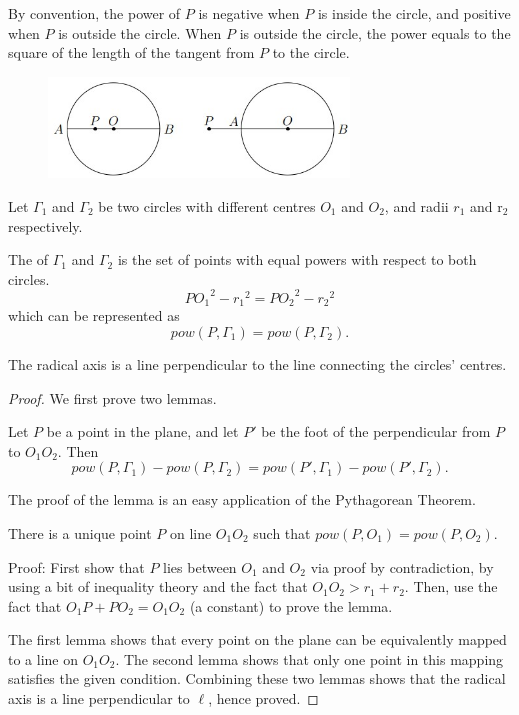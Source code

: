By convention, the power of $P$ is negative when $P$ is inside the circle, and positive when $P$
is outside the circle. When $P$ is outside the circle, the power equals to the square of the length
of the tangent from $P$ to the circle.

\begin{figure}[H]
    \centering
    \includegraphics[width=8cm]{images/Power_of_a_point3.jpg}
\end{figure}

Let $\Gamma_1$ and $\Gamma_2$ be two circles with different centres $O_1$ and $O_2$, and radii $r_1$ and r$_2$ respectively.

\begin{definition}
The  of $\Gamma_1$ and $\Gamma_2$ is the set of points with equal powers with respect to both circles.
\[ {PO_1}^2-{r_1}^2 = {PO_2}^2-{r_2}^2 \]
which can be represented as 
\[ pow(P, \Gamma_1) = pow(P, \Gamma_2). \]
\end{definition}

\begin{lemma}
The radical axis is a line perpendicular to the line connecting the circles' centres.
\end{lemma}

\begin{proof}
We first prove two lemmas.
\begin{lemma}
Let $P$ be a point in the plane, and let $P'$ be the foot of the perpendicular from $P$ to $O_1O_2$. Then \[ pow(P, \Gamma_1)-pow(P, \Gamma_2) = pow(P', \Gamma_1)-pow(P', \Gamma_2). \]
\end{lemma}
The proof of the lemma is an easy application of the Pythagorean Theorem.

\begin{lemma}
There is a unique point $P$ on line $O_1O_2$ such that $pow(P, O_1) = pow(P, O_2)$.
\end{lemma}

Proof: First show that $P$ lies between $O_1$ and $O_2$ via proof by contradiction, by using a bit of inequality theory and the fact that $O_1O_2 > r_1 + r_2$. Then, use the fact that $O_1P + PO_2 = O_1O_2$ (a constant) to prove the lemma.

The first lemma shows that every point on the plane can be equivalently mapped to a line on $O_1O_2$. The second lemma shows that only one point in this mapping satisfies the given condition. Combining these two lemmas shows that the radical axis is a line perpendicular to $\ell$, hence proved.
\end{proof}

